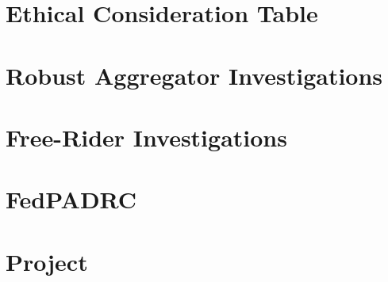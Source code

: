 \chapter{Ethical Consideration Table}


\chapter{Robust Aggregator Investigations}


\chapter{Free-Rider Investigations}


\chapter{FedPADRC}


\chapter{Project}

